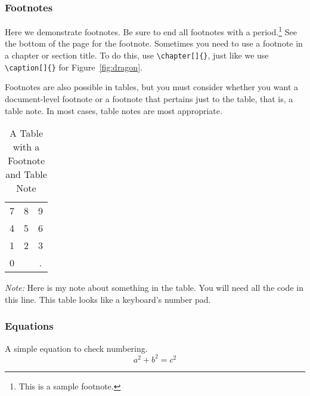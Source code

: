 \subsubsection{Footnotes}
Here we demonstrate footnotes. Be sure to end all footnotes with a period.\footnote{This is a sample footnote.} See the bottom of the page for the footnote.
Sometimes you need to use a footnote in a chapter or section title.
To do this, use \verb|\chapter[]{}|, just like we use \verb|\caption[]{}| for Figure~\ref{fig:dragon}.

Footnotes are also possible in tables, but you must consider whether you want a document-level footnote or a footnote that pertains just to the table, that is, a table note.  In most cases, table notes are most appropriate.

\begin{table}[H] %
    {\centering %
    \caption{A Table with a Footnote and Table Note}
    \label{table:sample}
    \begin{tabular}{ c c c }
    \hline
      7 & 8 & 9 \\
      4 & 5 & 6 \\
      1 & 2 & 3 \\
      0\footnotemark &  & . \\
    \hline
    \end{tabular} \par} %
    {\footnotesize\textit{Note:} Here is my note about something in the table.  You will need all the code in this line.  This table looks like a keyboard's number pad.\singlespacing} %
\end{table}

\subsubsection{Equations}
A simple equation to check numbering.
\begin{equation} \label{eq:pi-theory}
a^2 + b^2 = c^2
\end{equation}

